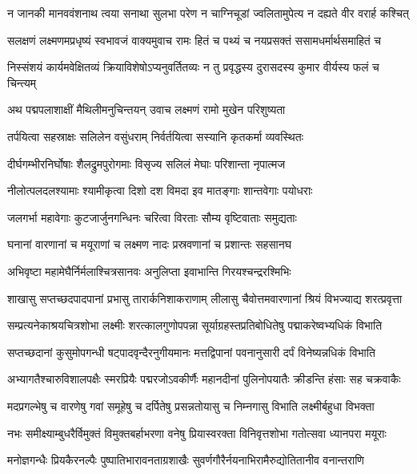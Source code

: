 \twolineshloka
{न जानकी मानववंशनाथ त्वया सनाथा सुलभा परेण}
{न चाग्निचूडां ज्वलितामुपेत्य न दह्यते वीर वरार्ह कश्चित्} %

\twolineshloka
{सलक्षणं लक्ष्मणमप्रधृष्यं स्वभावजं वाक्यमुवाच रामः}
{हितं च पथ्यं च नयप्रसक्तं ससामधर्मार्थसमाहितं च} %

\twolineshloka
{निस्संशयं कार्यमवेक्षितव्यं क्रियाविशेषोऽप्यनुवर्तितव्यः}
{न तु प्रवृद्धस्य दुरासदस्य कुमार वीर्यस्य फलं च चिन्त्यम्} %

\twolineshloka
{अथ पद्मपलाशाक्षीं मैथिलीमनुचिन्तयन्}
{उवाच लक्ष्मणं रामो मुखेन परिशुष्यता} %

\twolineshloka
{तर्पयित्वा सहस्राक्षः सलिलेन वसुंधराम्}
{निर्वर्तयित्वा सस्यानि कृतकर्मा व्यवस्थितः} %

\twolineshloka
{दीर्घगम्भीरनिर्घोषाः शैलद्रुमपुरोगमाः}
{विसृज्य सलिलं मेघाः परिशान्ता नृपात्मज} %

\twolineshloka
{नीलोत्पलदलश्यामाः श्यामीकृत्वा दिशो दश}
{विमदा इव मातङ्गाः शान्तवेगाः पयोधराः} %

\twolineshloka
{जलगर्भा महावेगाः कुटजार्जुनगन्धिनः}
{चरित्वा विरताः सौम्य वृष्टिवाताः समुद्यताः} %

\twolineshloka
{घनानां वारणानां च मयूराणां च लक्ष्मण}
{नादः प्रस्रवणानां च प्रशान्तः सहसानघ} %

\twolineshloka
{अभिवृष्टा महामेघैर्निर्मलाश्चित्रसानवः}
{अनुलिप्ता इवाभान्ति गिरयश्चन्द्ररश्मिभिः} %

\twolineshloka
{शाखासु सप्तच्छदपादपानां प्रभासु तारार्कनिशाकराणाम्}
{लीलासु चैवोत्तमवारणानां श्रियं विभज्याद्य शरत्प्रवृत्ता} %

\twolineshloka
{सम्प्रत्यनेकाश्रयचित्रशोभा लक्ष्मीः शरत्कालगुणोपपन्ना}
{सूर्याग्रहस्तप्रतिबोधितेषु पद्माकरेष्वभ्यधिकं विभाति} %

\twolineshloka
{सप्तच्छदानां कुसुमोपगन्धी षट्पादवृन्दैरनुगीयमानः}
{मत्तद्विपानां पवनानुसारी दर्पं विनेष्यन्नधिकं विभाति} %

\twolineshloka
{अभ्यागतैश्चारुविशालपक्षैः स्मरप्रियैः पद्मरजोऽवकीर्णैः}
{महानदीनां पुलिनोपयातैः क्रीडन्ति हंसाः सह चक्रवाकैः} %

\twolineshloka
{मदप्रगल्भेषु च वारणेषु गवां समूहेषु च दर्पितेषु}
{प्रसन्नतोयासु च निम्नगासु विभाति लक्ष्मीर्बहुधा विभक्ता} %

\twolineshloka
{नभः समीक्ष्याम्बुधरैर्विमुक्तं विमुक्तबर्हाभरणा वनेषु}
{प्रियास्वरक्ता विनिवृत्तशोभा गतोत्सवा ध्यानपरा मयूराः} %

\twolineshloka
{मनोज्ञगन्धैः प्रियकैरनल्पैः पुष्पातिभारावनताग्रशाखैः}
{सुवर्णगौरैर्नयनाभिरामैरुद्योतितानीव वनान्तराणि} %

